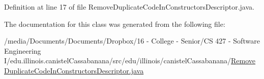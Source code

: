 Definition at line 17 of file RemoveDuplicateCodeInConstructorsDescriptor.java.



The documentation for this class was generated from the following file:\begin{DoxyCompactItemize}
\item 
/media/Documents/Documents/Dropbox/16 -\/ College -\/ Senior/CS 427 -\/ Software Engineering I/edu.illinois.canistelCassabanana/src/edu/illinois/canistelCassabanana/\hyperlink{RemoveDuplicateCodeInConstructorsDescriptor_8java}{RemoveDuplicateCodeInConstructorsDescriptor.java}\end{DoxyCompactItemize}

